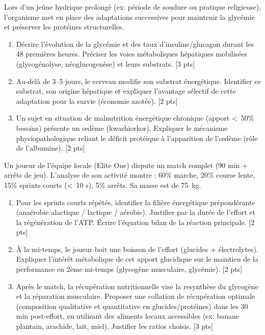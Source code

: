\documentclass[11pt]{article}
\begin{document}
\begin{exercice}
Lors d'un jeûne hydrique prolongé (ex: période de soudure ou pratique religieuse), l'organisme met en place des adaptations successives pour maintenir la glycémie et préserver les protéines structurelles.
\begin{enumerate}
    \item Décrire l'évolution de la glycémie et des taux d'insuline/glucagon durant les 48 premières heures. Préciser les voies métaboliques hépatiques mobilisées (glycogénolyse, néoglucogenèse) et leurs substrats. [3 pts]
    \item Au-delà de 3--5 jours, le cerveau modifie son substrat énergétique. Identifier ce substrat, son origine hépatique et expliquer l'avantage sélectif de cette adaptation pour la survie (économie azotée). [2 pts]
    \item Un sujet en situation de malnutrition énergétique chronique (apport \textless\ 50\% besoins) présente un œdème (kwashiorkor). Expliquer le mécanisme physiopathologique reliant le déficit protéique à l'apparition de l'œdème (rôle de l'albumine). [2 pts]
\end{enumerate}
\end{exercice}

\begin{exercice}
Un joueur de l'équipe locale (Elite One) dispute un match complet (90 min + arrêts de jeu). L'analyse de son activité montre : 60\% marche, 20\% course lente, 15\% sprints courts (\textless\ 10 s), 5\% arrêts. Sa masse est de \SI{75}{kg}.
\begin{enumerate}
    \item Pour les sprints courts répétés, identifier la filière énergétique prépondérante (anaérobie alactique / lactique / aérobie). Justifier par la durée de l'effort et la régénération de l'ATP. Écrire l'équation bilan de la réaction principale. [2 pts]
    \item À la mi-temps, le joueur boit une boisson de l'effort (glucides + électrolytes). Expliquer l'intérêt métabolique de cet apport glucidique sur le maintien de la performance en 2ème mi-temps (glycogène musculaire, glycémie). [2 pts]
    \item Après le match, la récupération nutritionnelle vise la resynthèse du glycogène et la réparation musculaire. Proposer une collation de récupération optimale (composition qualitative et quantitative en glucides/protéines) dans les 30 min post-effort, en utilisant des aliments locaux accessibles (ex: banane plantain, arachide, lait, miel). Justifier les ratios choisis. [3 pts]
\end{enumerate}
\end{exercice}
\end{document}
